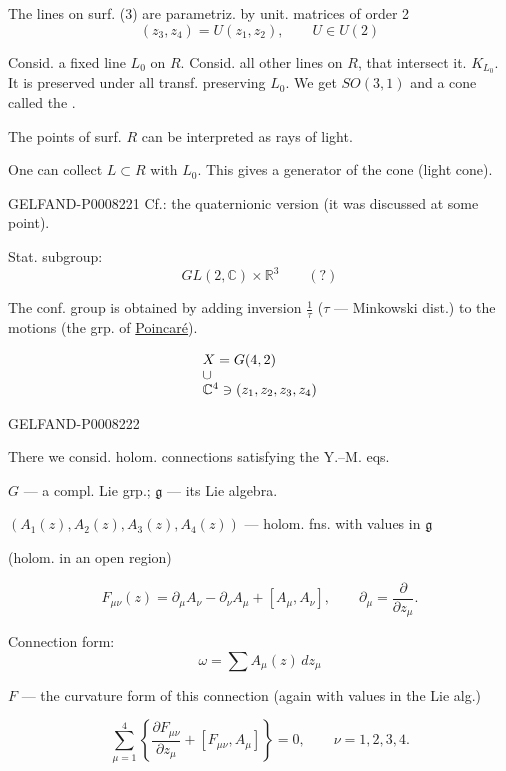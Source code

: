 The lines on surf. (3) are parametriz. by unit. matrices of order 2
\[
(z_3,z_4)=U(z_1,z_2),\qquad U\in U(2)
\]


Consid. a fixed line \(L_0\) on \(R\). Consid. all other lines on \(R\), that intersect it.
 \(K_{L_0}\). It is preserved under all transf. preserving \(L_0\).
We get \(SO(3,1)\) and a cone called the .

The points of surf. \(R\) can be interpreted as rays of light.

One can collect  \(L\subset R\) with \(L_0\).
This gives a generator of the cone (light cone).


\begin{GelfandAdjacentEvidence}{GELFAND-P000822}{1}
Cf.: the quaternionic version (it was discussed at some point).

Stat. subgroup:
\[
GL(2,\mathbb{C})\times\mathbb{R}^3\qquad(?)
\]

The conf. group is obtained by adding inversion \(\frac{1}{\tau}\) (\(\tau\) — Minkowski dist.)
to the motions (the grp. of \uline{Poincaré}).

\[
\begin{array}{@{}l@{}}
X=G(4,2)\\[-.3ex]
\cup\\[-.3ex]
\mathbb{C}^4\ni(z_1,z_2,z_3,z_4)
\end{array}
\]
\end{GelfandAdjacentEvidence}
\begin{GelfandAdjacentEvidence}{GELFAND-P000822}{2}


There we consid. holom. connections satisfying the Y.–M. eqs.

\(G\) — a compl. Lie grp.; \(\mathfrak g\) — its Lie algebra.

\((A_1(z),A_2(z),A_3(z),A_4(z))\) — holom. fns. with values in \(\mathfrak g\)

(holom. in an open region)

\begin{equation*}
F_{\mu\nu}(z)=\partial_\mu A_\nu-\partial_\nu A_\mu+[A_\mu,A_\nu],
\qquad \partial_\mu=\frac{\partial}{\partial z_\mu}.
\tag{5}
\end{equation*}

Connection form:
\[
\omega=\sum A_\mu(z)\,dz_\mu
\]

\(F\) — the curvature form of this connection (again with values in the Lie alg.)

\begin{equation*}
\sum_{\mu=1}^{4}\left\{\frac{\partial F_{\mu\nu}}{\partial z_\mu}
 +[F_{\mu\nu},A_\mu]\right\}=0,\qquad \nu=1,2,3,4.
\tag{6}
\end{equation*}
\end{GelfandAdjacentEvidence}
